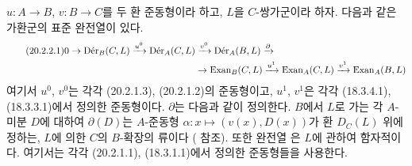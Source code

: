 \begin{theorem}[20.2.2]
\label{0.20.2.2-ko}
$u:A\to B$, $v:B\to C$를 두 환 준동형이라 하고, $L$을
$C$-쌍가군이라 하자. 다음과 같은 가환군의 표준 완전열이 있다.
\begin{align}
\tag{20.2.2.1}
\label{0.20.2.2.1-ko}
  0\to\operatorname{D\acute{e}r}_B(C,L)\xrightarrow{u^0}
  \operatorname{D\acute{e}r}_A(C,L)&\xrightarrow{v^0}
  \operatorname{D\acute{e}r}_A(B,L)\xrightarrow{\partial} \\
  &\to\operatorname{Exan}_B(C,L)\xrightarrow{u^1}
  \operatorname{Exan}_A(C,L)\xrightarrow{v^1}
  \operatorname{Exan}_A(B,L) \notag
\end{align}
여기서 $u^0$, $v^0$는 각각 (20.2.1.3), (20.2.1.2)의 준동형이고,
$u^1$, $v^1$은 각각 (18.3.4.1), (18.3.3.1)에서 정의한 준동형이다.
$\partial$는 다음과 같이 정의한다. $B$에서 $L$로 가는 각 $A$-미분
$D$에 대하여 $\partial(D)$는 $A$-준동형
$\alpha:x\mapsto(v(x),D(x))$가 환 $D_C(L)$ 위에 정하는, $L$에 의한
$C$의 $B$-확장의 류이다 ( 참조). 또한 완전열
은 $L$에 관하여 함자적이다. 여기서는 각각
(20.2.1.1), (18.3.1.1)에서 정의한 준동형들을 사용한다.
\end{theorem}

